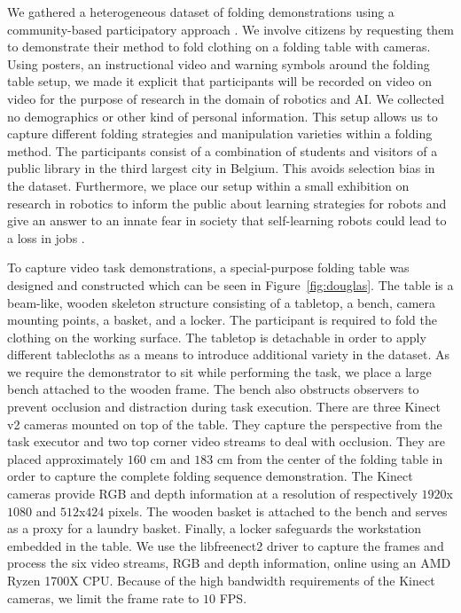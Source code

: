 \documentclass[\home/main.tex]{subfiles}
\begin{document}
We gathered a heterogeneous dataset of folding demonstrations using a community-based participatory approach \autocite{English2018}. We involve citizens by requesting them to demonstrate their method to fold clothing on a folding table with cameras. Using posters, an instructional video and warning symbols around the folding table setup, we made it explicit that participants will be recorded on video on video for the purpose of research in the domain of robotics and AI. We collected no demographics or other kind of personal information. This setup allows us to capture different folding strategies and manipulation varieties within a folding method. The participants consist of a combination of students and visitors of a public library in the third largest city in Belgium. This avoids selection bias in the dataset. Furthermore, we place our setup within a small exhibition on research in robotics to inform the public about learning strategies for robots and give an answer to an innate fear in society that self-learning robots could lead to a loss in jobs \autocite{Fleming2019}. \par

To capture video task demonstrations, a special-purpose folding table was designed and constructed which can be seen in Figure~\ref{fig:douglas}. The table is a beam-like, wooden skeleton structure consisting of a tabletop, a bench, camera mounting points, a basket, and a locker. The participant is required to fold the clothing on the working surface. The tabletop is detachable in order to apply different tablecloths as a means to introduce additional variety in the dataset. As we require the demonstrator to sit while performing the task, we place a large bench attached to the wooden frame. The bench also obstructs observers to prevent occlusion and distraction during task execution. There are three Kinect v2 cameras mounted on top of the table. They capture the perspective from the task executor and two top corner video streams to deal with occlusion. They are placed approximately $160$ cm and $183$ cm from the center of the folding table in order to capture the complete folding sequence demonstration. The Kinect cameras provide RGB and depth information at a resolution of respectively $1920$x$1080$ and $512$x$424$ pixels. The wooden basket is attached to the bench and serves as a proxy for a laundry basket. Finally, a locker safeguards the workstation embedded in the table. We use the libfreenect2 driver \autocite{Xiang2016} to capture the frames and process the six video streams, RGB and depth information, online using an AMD Ryzen 1700X CPU. Because of the high bandwidth requirements of the Kinect cameras, we limit the frame rate to $10$ FPS. \par 
\end{document}

